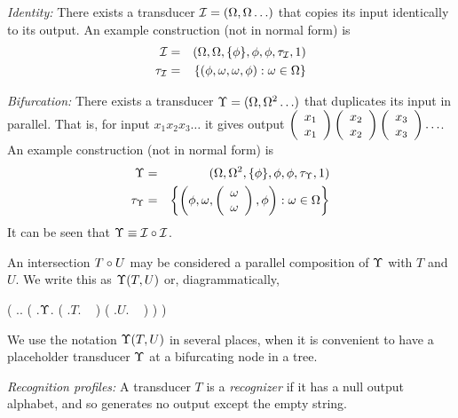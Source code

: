 \documentclass{beamer}
\begin{document}
\begin{frame}{}

{\em Identity:}
There exists a transducer ${\cal I}=(\Omega,\Omega\ldots)$ that copies its input identically to its output.
An example construction (not in normal form) is
\begin{eqnarray*}
{\cal I} & = & (\Omega,\Omega,\{\phi\},\phi,\phi,\tau_{{\cal I}},1) \\
\tau_{{\cal I}} & = & \left\{(\phi,\omega,\omega,\phi):\omega\in\Omega\right\}
\end{eqnarray*}

\end{frame}

\begin{frame}{}

{\em Bifurcation:}
There exists a transducer $\Upsilon=(\Omega,\Omega^2\ldots)$ that duplicates its input in parallel.
That is, for input $x_1 x_2 x_3 \ldots$ it gives output $\left( \begin{array}{l} x_1 \\ x_1 \end{array} \right)\left( \begin{array}{l} x_2 \\ x_2 \end{array} \right)\left( \begin{array}{l} x_3 \\ x_3 \end{array} \right)\ldots$.
An example construction (not in normal form) is
\begin{eqnarray*}
\Upsilon & = & (\Omega,\Omega^2,\{\phi\},\phi,\phi,\tau_{\Upsilon},1) \\
\tau_{\Upsilon} & = & \left\{\left(\phi,\omega,\left( \begin{array}{l} \omega \\ \omega \end{array} \right),\phi\right):\omega\in\Omega\right\}
\end{eqnarray*}
It can be seen that $\Upsilon \equiv {\cal I} \circ {\cal I}$.

An intersection $T \circ U$ may be considered a parallel composition of $\Upsilon$ with $T$ and $U$.
We write this as  $\Upsilon(T, U)$ or, diagrammatically,
\begin{parsetree}
 ( .. ( .$\Upsilon$. ( .$T$. ~ ) ( .$U$. ~ ) ) )
\end{parsetree}

We use the notation $\Upsilon(T, U)$ in several places, when it is convenient to have a placeholder transducer $\Upsilon$ at a bifurcating node in a tree.

\end{frame}

\begin{frame}{}

{\em Recognition profiles:}
A transducer $T$ is a {\em recognizer} if it has a null output alphabet, and so generates no output except the empty string.

\end{frame}
\end{document}
